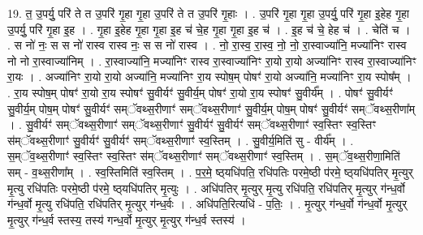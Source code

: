 \documentclass[17pt]{extarticle}
\begin{document}
19. त॒ उ॒पर्यु॒ परि॑ ते त उ॒परि॑ गृ॒हा गृ॒हा उ॒परि॑ ते त उ॒परि॑ गृ॒हाः । . उ॒परि॑ गृ॒हा गृ॒हा उ॒पर्यु॒ परि॑ गृ॒हा इ॒हेह गृ॒हा उ॒पर्यु॒ परि॑ गृ॒हा इ॒ह । . गृ॒हा इ॒हेह गृ॒हा गृ॒हा इ॒ह च॑ चे॒ह गृ॒हा गृ॒हा इ॒ह च॑ । . इ॒ह च॑ चे॒ हेह च॑ । . चेति॑ च । . स नो॑ नः॒ स स नो॑ रास्व रास्व नः॒ स स नो॑ रास्व । . नो॒ रा॒स्व॒ रा॒स्व॒ नो॒ नो॒ रा॒स्वाज्या॑नि॒ मज्या॑निꣳ रास्व नो नो रा॒स्वाज्या॑निम् । . रा॒स्वाज्या॑नि॒ मज्या॑निꣳ रास्व रा॒स्वाज्या॑निꣳ रा॒यो रा॒यो अज्या॑निꣳ रास्व रा॒स्वाज्या॑निꣳ रा॒यः । . अज्या॑निꣳ रा॒यो रा॒यो अज्या॑नि॒ मज्या॑निꣳ रा॒य स्पोष॒म् पोषꣳ॑ रा॒यो अज्या॑नि॒ मज्या॑निꣳ रा॒य स्पोष᳚म् । . रा॒य स्पोष॒म् पोषꣳ॑ रा॒यो रा॒य स्पोषꣳ॑ सु॒वीर्यꣳ॑ सु॒वीर्य॒म् पोषꣳ॑ रा॒यो रा॒य स्पोषꣳ॑ सु॒वीर्य᳚म् । . पोषꣳ॑ सु॒वीर्यꣳ॑ सु॒वीर्य॒म् पोष॒म् पोषꣳ॑ सु॒वीर्यꣳ॑ सम्ॅवथ्स॒रीणाꣳ॑ सम्ॅवथ्स॒रीणाꣳ॑ सु॒वीर्य॒म् पोष॒म् पोषꣳ॑ सु॒वीर्यꣳ॑ सम्ॅवथ्स॒रीणा᳚म् । . सु॒वीर्यꣳ॑ सम्ॅवथ्स॒रीणाꣳ॑ सम्ॅवथ्स॒रीणाꣳ॑ सु॒वीर्यꣳ॑ सु॒वीर्यꣳ॑ सम्ॅवथ्स॒रीणाꣳ॑ स्व॒स्तिꣳ स्व॒स्तिꣳ स॑म्ॅवथ्स॒रीणाꣳ॑ सु॒वीर्यꣳ॑ सु॒वीर्यꣳ॑ सम्ॅवथ्स॒रीणाꣳ॑ स्व॒स्तिम् । . सु॒वीर्य॒मिति॑ सु - वीर्य᳚म् । . स॒म्ॅव॒थ्स॒रीणाꣳ॑ स्व॒स्तिꣳ स्व॒स्तिꣳ स॑म्ॅवथ्स॒रीणाꣳ॑ सम्ॅवथ्स॒रीणाꣳ॑ स्व॒स्तिम् । . स॒म्ॅव॒थ्स॒रीणा॒मिति॑ सम् - व॒थ्स॒रीणा᳚म् । . स्व॒स्तिमिति॑ स्व॒स्तिम् । . प॒र॒मे॒ ष्ठ्‌यधि॑पति॒ रधि॑पतिः परमे॒ष्ठी प॑रमे॒ ष्ठ्‌यधि॑पतिर् मृ॒त्युर् मृ॒त्यु रधि॑पतिः परमे॒ष्ठी प॑रमे॒ ष्ठ्‌यधि॑पतिर् मृ॒त्युः । . अधि॑पतिर् मृ॒त्युर् मृ॒त्यु रधि॑पति॒ रधि॑पतिर् मृ॒त्युर् ग॑न्ध॒र्वो ग॑न्ध॒र्वो मृ॒त्यु रधि॑पति॒ रधि॑पतिर् मृ॒त्युर् ग॑न्ध॒र्वः । . अधि॑पति॒रित्यधि॑ - प॒तिः॒ । . मृ॒त्युर् ग॑न्ध॒र्वो ग॑न्ध॒र्वो मृ॒त्युर् मृ॒त्युर् ग॑न्ध॒र्व स्तस्य॒ तस्य॑ गन्ध॒र्वो मृ॒त्युर् मृ॒त्युर् ग॑न्ध॒र्व स्तस्य॑ । \newline
\end{document}
